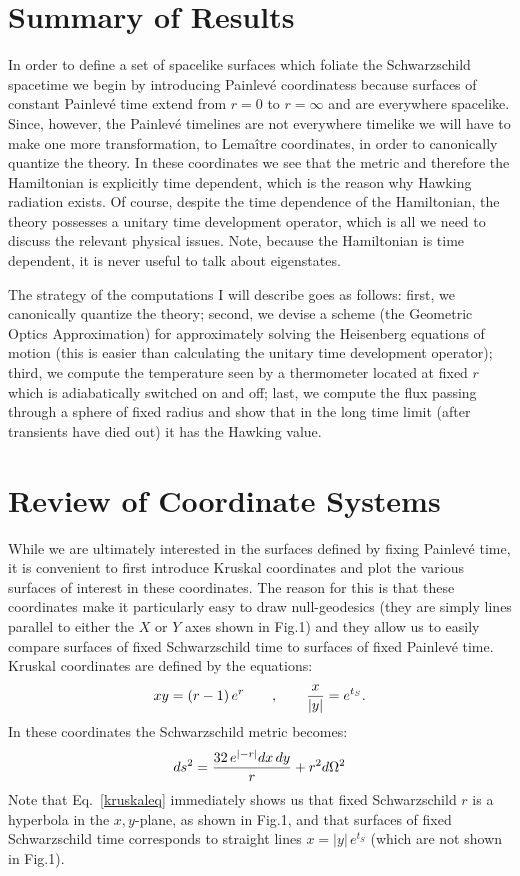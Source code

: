 \documentclass[12pt]{article}
\begin{document}
\section{Summary of Results}

In order to define a set of spacelike surfaces which
foliate the Schwarzschild spacetime we begin by introducing Painlev\'e coordinatess
because surfaces of constant Painlev\'e time extend from $r=0$ to $r=\infty$ and are
everywhere spacelike.  Since, however, the
Painlev\'e timelines are not everywhere timelike we will have to make one more transformation,
to Lema\^itre coordinates, in order to canonically quantize the theory.
In these coordinates we see that the metric and therefore the Hamiltonian
is explicitly time dependent, which is the reason why Hawking radiation exists.
Of course, despite the time dependence of the Hamiltonian, the theory possesses a
unitary time development operator, which is all we need to discuss the relevant
physical issues.  Note, because the Hamiltonian is time dependent, it is never
useful to talk about eigenstates.

The strategy of the computations I will describe goes as follows: first, we canonically
quantize the theory; second, we devise a scheme (the Geometric Optics
Approximation) for approximately solving the Heisenberg equations of motion
(this is easier than calculating the unitary time development operator); third, we
compute the temperature seen by a thermometer located at fixed $r$ which is adiabatically
switched on and off; last, we compute the flux passing through a sphere of fixed
radius and show that in the long time limit (after transients have died out)
it has the Hawking value.

\section{Review of Coordinate Systems}

While we are ultimately interested in the surfaces defined by fixing Painlev\'e time,
it is convenient to first introduce Kruskal coordinates and plot the various surfaces
of interest in these coordinates.  The reason for this is that these coordinates
make it particularly easy to draw null-geodesics (they are simply lines parallel to
either the $X$ or $Y$ axes shown in Fig.1) and they allow us to easily compare
surfaces of fixed Schwarzschild time to surfaces of fixed Painlev\'e time.
Kruskal coordinates are defined by the equations:
\begin{equation}
 x y = (r-1)\,e^{r} \qquad , \qquad
		{x \over \vert y \vert} = e^{t_S} .
\label{kruskaleq}
\end{equation}
In these coordinates the Schwarzschild metric becomes:
\begin{equation}
 ds^2 = {32\,  e^{\vert -r \vert} dx\,dy \over r} + r^2 d\Omega^2
\end{equation}
Note that Eq.~\ref{kruskaleq} immediately shows us that fixed Schwarzschild $r$ is a
hyperbola in the $x,y$-plane, as shown in Fig.1, and that surfaces of fixed
Schwarzschild time corresponds to straight lines $x=\vert y \vert\,e^{t_S}$ (which are not
shown in Fig.1).
\end{document}
